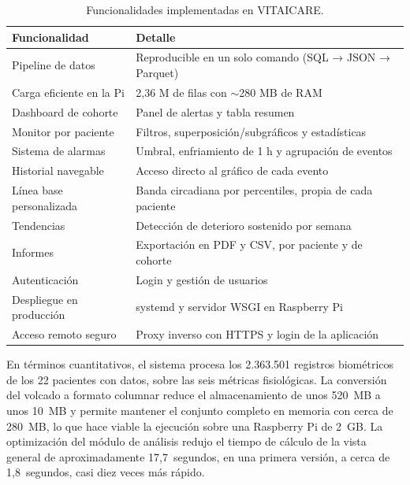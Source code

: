 \documentclass[12pt,a4paper]{article}
\begin{document}
    \begin{table}[h]
        \centering
        \begin{tabular}{l l}
            \hline
            \textbf{Funcionalidad} & \textbf{Detalle} \\
            \hline
            Pipeline de datos & Reproducible en un solo comando (SQL → JSON → Parquet) \\
            Carga eficiente en la Pi & 2,36 M de filas con $\sim$280 MB de RAM \\
            Dashboard de cohorte & Panel de alertas y tabla resumen \\
            Monitor por paciente & Filtros, superposición/subgráficos y estadísticas \\
            Sistema de alarmas & Umbral, enfriamiento de 1 h y agrupación de eventos \\
            Historial navegable & Acceso directo al gráfico de cada evento \\
            Línea base personalizada & Banda circadiana por percentiles, propia de cada paciente \\
            Tendencias & Detección de deterioro sostenido por semana \\
            Informes & Exportación en PDF y CSV, por paciente y de cohorte \\
            Autenticación & Login y gestión de usuarios \\
            Despliegue en producción & systemd y servidor WSGI en Raspberry Pi \\
            Acceso remoto seguro & Proxy inverso con HTTPS y login de la aplicación \\
            \hline
        \end{tabular}
        \caption{Funcionalidades implementadas en VITAICARE.}
        \label{tab:funcionalidades}
    \end{table}

    En términos cuantitativos, el sistema procesa los 2.363.501 registros biométricos de los 22 pacientes con datos, sobre las seis métricas fisiológicas. La conversión del volcado a formato columnar reduce el almacenamiento de unos 520~MB a unos 10~MB y permite mantener el conjunto completo en memoria con cerca de 280~MB, lo que hace viable la ejecución sobre una Raspberry Pi de 2~GB. La optimización del módulo de análisis redujo el tiempo de cálculo de la vista general de aproximadamente 17,7~segundos, en una primera versión, a cerca de 1,8~segundos, casi diez veces más rápido.
\end{document}

